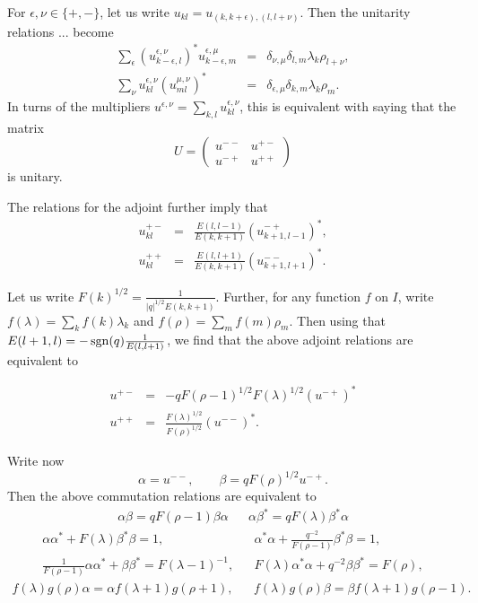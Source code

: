 For $\epsilon,\nu\in \{+,-\}$, let us write $u_{kl} = u_{(k,k+\epsilon),(l,l+\nu)}$. Then the unitarity relations ... become \begin{eqnarray*} \sum_{\epsilon} (u_{k-\epsilon,l}^{\epsilon,\nu})^*u_{k-\epsilon,m}^{\epsilon,\mu} &=& \delta_{\nu,\mu}\delta_{l,m} \lambda_k\rho_{l+\nu},\\ \sum_{\nu} u_{kl}^{\epsilon,\nu}(u_{ml}^{\mu,\nu})^* &=& \delta_{\epsilon,\mu}\delta_{k,m}\lambda_k\rho_m.\end{eqnarray*} In turns of the multipliers $u^{\epsilon,\nu} = \sum_{k,l} u^{\epsilon,\nu}_{kl}$, this is equivalent with saying that the matrix \[U = \begin{pmatrix} u^{--}& u^{+-} \\ u^{-+}&u^{++}\end{pmatrix}\] is unitary.

The relations for the adjoint further imply that \begin{eqnarray*}u_{kl}^{+-} &=&\frac{E(l,l-1)}{E(k,k+1)}(u_{k+1,l-1}^{-+})^*,\\  u_{kl}^{++}&=& \frac{E(l,l+1)}{E(k,k+1)}(u_{k+1,l+1}^{--})^* .\end{eqnarray*}

Let us write $F(k)^{1/2} = \frac{1}{|q|^{1/2}E(k,k+1)}$. Further, for any function $f$ on $I$, write $f(\lambda) = \sum_k f(k)\lambda_k$ and $f(\rho) = \sum_m f(m)\rho_m$. Then using that $E(l+1,l) = -\operatorname{\mathrm{sgn}}(q)\frac{1}{E(l,l+1)}$, we find that the above adjoint relations are equivalent to

\begin{eqnarray*} u^{+-} &=& -q F(\rho-1)^{1/2}F(\lambda)^{1/2}(u^{-+})^* \\ u^{++} &=&  \frac{F(\lambda)^{1/2}}{F(\rho)^{1/2}}(u^{--})^*.
\end{eqnarray*}

Write now \[\alpha = u^{--},\qquad \beta = qF(\rho)^{1/2}u^{-+}.\] Then the above commutation relations are equivalent to \begin{align*} \alpha \beta = qF(\rho-1)\beta\alpha && \alpha\beta^* = qF(\lambda)\beta^*\alpha\end{align*} \begin{align*} \alpha\alpha^* +F(\lambda)\beta^*\beta = 1,&& \alpha^*\alpha+\frac{q^{-2}}{F(\rho-1)}\beta^*\beta = 1,\\ \frac{1}{F(\rho-1)}\alpha\alpha^* +\beta\beta^* = F(\lambda-1)^{-1},&& F(\lambda)\alpha^*\alpha +q^{-2}\beta\beta^* = F(\rho),\end{align*} \begin{align*} f(\lambda)g(\rho)\alpha =
\alpha f(\lambda+1)g(\rho+1),&& f(\lambda)g(\rho)\beta = \beta f(\lambda+1)g(\rho-1).\end{align*}

